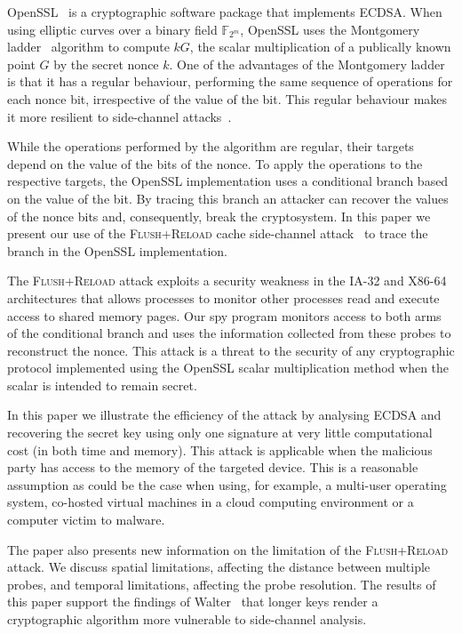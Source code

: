 \documentclass[twocolumn]{svjour3}
\newcommand{\fl}{\textsc{Flu\-sh+\allowbreak Re\-load}\xspace}
\newcommand{\myupcase}[1]{\uppercase{#1}}
\begin{document}
OpenSSL~\cite{openssl} is a cryptographic software package that implements \myupcase{ecdsa}.
When using elliptic curves over a binary field $\mathbb{F}_{2^m}$, OpenSSL uses the 
Montgomery ladder~\cite{montgomery87speeding,joye03montgomery} algorithm to compute $kG$, the scalar multiplication of a publically known point $G$ by the secret nonce $k$.
One of the advantages of the Montgomery ladder is that it has a regular behaviour, performing
the same sequence of operations for each nonce bit, irrespective of the value of the bit.
This regular behaviour makes it more resilient to side-channel attacks~\cite{joye03montgomery,okeya00elliptic}.

While the operations performed by the algorithm are regular, their targets depend on the value of the bits of the nonce.
To apply the operations to the respective targets, the OpenSSL implementation uses a conditional branch based on the value of the bit. By tracing this branch an attacker can recover the values of the nonce bits and, consequently, break the cryptosystem. In this paper we present our use of the \fl cache side-channel attack~\cite{yarom13flush} to trace the branch in the OpenSSL implementation.

The \fl attack exploits a security weakness in the IA-32 and X86-64 architectures that allows processes
to monitor other processes read and execute access to shared memory pages.
Our spy program monitors access to both arms of the conditional branch and uses the information
collected from these probes to reconstruct the nonce. This attack is a threat to the security of any cryptographic protocol implemented using the OpenSSL scalar multiplication method when the scalar is intended to remain secret.

In this paper we illustrate the efficiency of the attack by analysing \myupcase{ecdsa} and recovering the secret key using only one signature at very little computational cost (in both time and memory). This attack is applicable when the malicious party has access to the memory of the targeted device.
This is  a reasonable assumption as could be the case when using, for example, a multi-user operating system, co-hosted virtual machines in a cloud computing environment or a computer victim to malware. 

The paper also presents new information on the limitation of the \fl attack.
We discuss spatial limitations, affecting the distance between multiple probes, and 
temporal limitations, affecting the probe resolution.
The results of this paper support the findings of Walter~\cite{walter04longer} that longer keys render a cryptographic algorithm more vulnerable to side-channel analysis.
\end{document}
